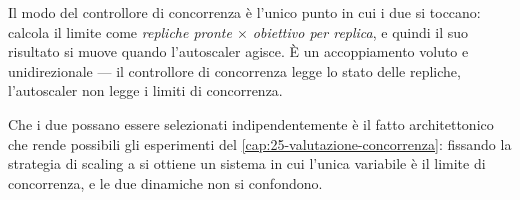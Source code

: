 Il modo  del controllore di concorrenza \`e l'unico punto
in cui i due si toccano: calcola il limite come \emph{repliche pronte $\times$
obiettivo per replica}, e quindi il suo risultato si muove quando l'autoscaler
agisce. \`E un accoppiamento voluto e unidirezionale --- il controllore di
concorrenza legge lo stato delle repliche, l'autoscaler non legge i limiti di
concorrenza.

Che i due possano essere selezionati indipendentemente \`e il fatto
architettonico che rende possibili gli esperimenti del
\cref{cap:25-valutazione-concorrenza}: fissando la strategia di scaling a
 si ottiene un sistema in cui l'unica variabile \`e il limite di
concorrenza, e le due dinamiche non si confondono.
